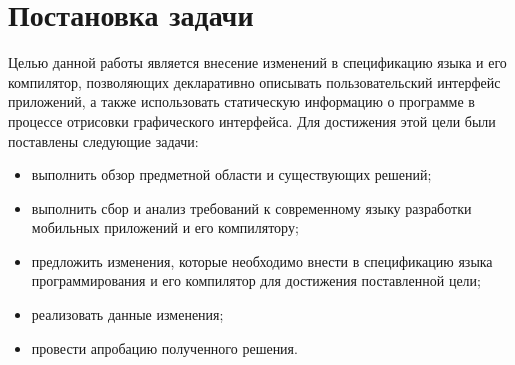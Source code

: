\section{Постановка задачи}
Целью данной работы является внесение изменений в спецификацию языка
 и его компилятор, позволяющих декларативно описывать
пользовательский интерфейс приложений, а также использовать статическую
информацию о программе в процессе отрисовки графического интерфейса.
Для достижения этой цели были поставлены следующие задачи:
\begin{itemize}
	\item выполнить обзор предметной области и существующих решений;
	\item выполнить сбор и анализ требований к современному языку разработки
	мобильных приложений и его компилятору;
	\item предложить изменения, которые необходимо внести в спецификацию языка
	программирования  и его компилятор для достижения
	поставленной цели;
	\item реализовать данные изменения;
	\item провести апробацию полученного решения.
\end{itemize}